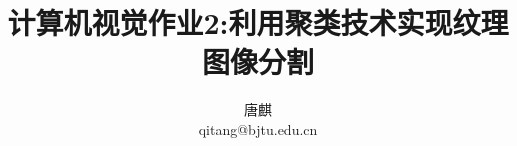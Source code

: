 \documentclass[10pt,journal,compsoc]{IEEEtran}
\begin{document}
\begin{sloppypar}

\title{\huge 计算机视觉作业­2:利用聚类技术实现纹理图像分割}

\author{唐麒\\qitang@bjtu.edu.cn}




\maketitle







\ifCLASSOPTIONcaptionsoff
  \newpage
\fi



%
%

\end{sloppypar}
\end{document}
